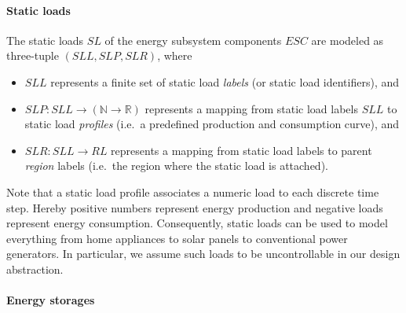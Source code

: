 \paragraph{Static loads}
\label{static_loads}

The static loads $SL$ of the energy subsystem components $ESC$ are modeled as three-tuple $(SLL, SLP, SLR)$, where
\begin{itemize}
	\item $SLL$ represents a finite set of static load \textit{labels} (or static load identifiers), and
	\item $SLP: SLL \rightarrow (\mathbb{N} \rightarrow \mathbb{R})$ represents a mapping from static load labels $SLL$ to static load \textit{profiles} (i.e.\ a predefined production and consumption curve), and
	\item $SLR: SLL \rightarrow RL$ represents a mapping from static load labels to parent \textit{region} labels (i.e.\ the region where the static load is attached).
\end{itemize}
Note that a static load profile associates a numeric load to each discrete time step. Hereby positive numbers represent energy production and negative loads represent energy consumption. Consequently, static loads can be used to model everything from home appliances to solar panels to conventional power generators. In particular, we assume such loads to be uncontrollable in our design abstraction.

\paragraph{Energy storages}
\label{energy_storages}

